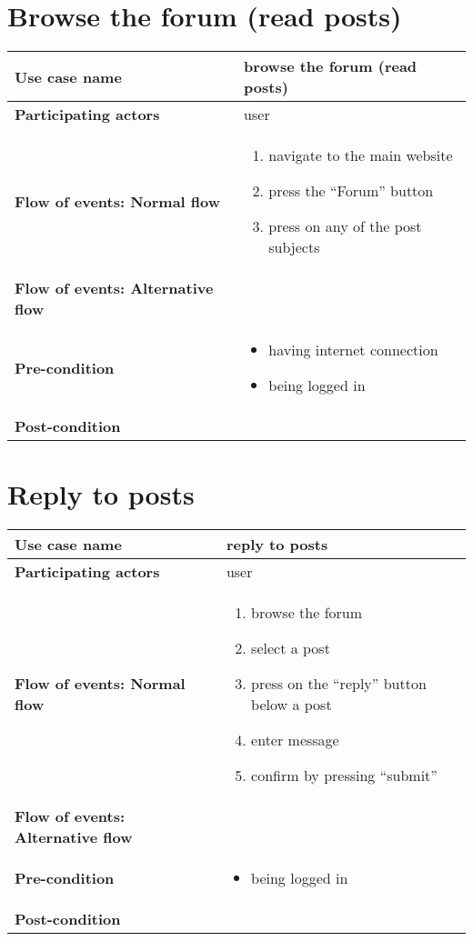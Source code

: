 \documentclass[a4paper, 13pt, draft]{report}
\begin{document}
\section*{Browse the forum (read posts)}

\begin{center}
    \begin{tabular}{| >{\bf}l | p{5.55cm} |} 
	\hline
	Use case name & browse the forum (read posts) \\ 
	\hline
	Participating actors & user \\
	\hline
	Flow of events: Normal flow & 
	\begin{enumerate}		
	    \item navigate to the main website
	    \item press the ``Forum'' button
	    \item press on any of the post subjects
	\end{enumerate}	\\
	\hline
	Flow of events: Alternative flow & \notapplicable \\
	\hline
	Pre-condition & 
	\begin{itemize} 
	    \item having internet connection
	    \item being logged in
	\end{itemize} \\
	\hline
	Post-condition & \notapplicable \\
	\hline
    \end{tabular}
\end{center}

\section*{Reply to posts}

\begin{center}
    \begin{tabular}{| >{\bf}l | p{5.55cm} |} 
	\hline
	Use case name & reply to posts \\ 
	\hline
	Participating actors & user \\
	\hline
	Flow of events: Normal flow & 
	\begin{enumerate}		
	    \item browse the forum
	    \item select a post
	    \item press on the ``reply'' button below a post
	    \item enter message
	    \item confirm by pressing ``submit''
	\end{enumerate}	\\
	\hline
	Flow of events: Alternative flow & \notapplicable \\
	\hline
	Pre-condition & 
	\begin{itemize} 
	    \item being logged in
	\end{itemize} \\
	\hline
	Post-condition & \notapplicable \\
	\hline
    \end{tabular}
\end{center}
\end{document}
